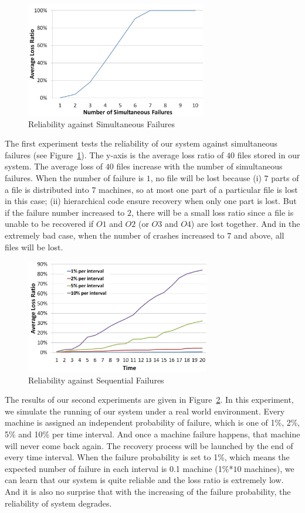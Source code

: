 \documentclass[conference]{IEEEtran}
\begin{document}
\begin{figure}
	\centering
		\includegraphics[height=50mm]{exp1.jpg}
		\caption{Reliability against Simultaneous Failures}
	\label{fig:exp1}
\end{figure}


The first experiment tests the reliability of our system against simultaneous failures (see Figure~\ref{fig:exp1}). The y-axis is the average loss ratio of $40$ files stored in our system. The average loss of $40$ files increase with the number of simultaneous failures. When the number of failure is $1$, no file will be lost because (i) $7$ parts of a file is distributed into $7$ machines, so at most one part of a particular file is lost in this case; (ii) hierarchical code ensure recovery when only one part is lost. But if the failure number increased to $2$, there will be a small loss ratio since a file is unable to be recovered if $O1$ and $O2$ (or $O3$ and $O4$) are lost together. And in the extremely bad case, when the number of crashes increased to $7$ and above, all files will be lost.

\begin{figure}
	\centering
		\includegraphics[height=50mm]{exp2.jpg}
		\caption{Reliability against Sequential Failures}
	\label{fig:exp2}
\end{figure}

The results of our second experiments are given in Figure~\ref{fig:exp2}. In this experiment, we simulate the running of our system under a real world environment. Every machine is assigned an independent probability of failure, which is one of  1\%, 2\%, 5\% and 10\% per time interval. And once a machine failure happens, that machine will never come back again. The recovery process will be launched by the end of every time interval. When the failure probability is set to 1\%, which means the expected number of failure in each interval is 0.1 machine (1\%*$10$ machines), we can learn that our system is quite reliable and the loss ratio is extremely low. And it is also no surprise that with the increasing of the failure probability, the reliability of system degrades.
\end{document}
